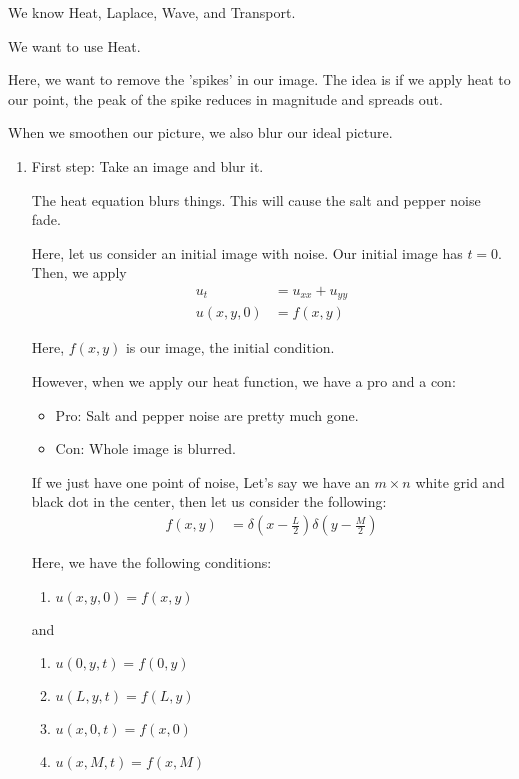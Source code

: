 \documentclass{article}
\begin{document}
We know Heat, Laplace, Wave, and Transport.

We want to use Heat.


Here, we want to remove the 'spikes' in our image. The idea is if we apply heat to our point, the peak of the spike reduces in magnitude and spreads out.

When we smoothen our picture, we also blur our ideal picture.

\begin{enumerate}
  \item First step: Take an image and blur it.

  The heat equation blurs things. This will cause the salt and pepper noise fade.

  Here, let us consider an initial image with noise. Our initial image has $t = 0$. Then, we apply
  \begin{align}
    u_t & = u_{xx} + u_{yy}\\
    u(x, y, 0) & = f(x, y)
  \end{align}

  Here, $f(x, y)$ is our image, the initial condition.

  However, when we apply our heat function, we have a pro and a con:
  \begin{itemize}
    \item Pro: Salt and pepper noise are pretty much gone.
    \item Con: Whole image is blurred.
  \end{itemize}

  If we just have one point of noise, Let's say we have an $m \times n$ white grid and black dot in the center,
  then let us consider the following:
  \begin{align}
    f(x, y) & = \delta\left(x - \frac{L}{2}\right) \delta\left(y - \frac{M}{2}\right)
  \end{align}

  Here, we have the following conditions:
  \begin{enumerate}
    \item $u(x, y, 0) = f(x, y)$
  \end{enumerate}

  and
  \begin{enumerate}
    \item $u(0, y, t) = f(0, y)$
    \item $u(L, y, t) = f(L, y)$
    \item $u(x, 0, t) = f(x, 0)$
    \item $u(x, M, t) = f(x, M)$
  \end{enumerate}
\end{enumerate}


\end{document}
